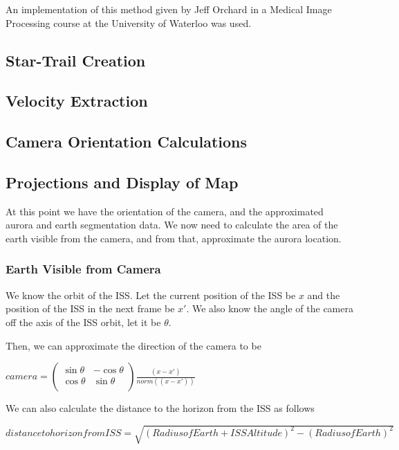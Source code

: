\documentclass[12pt]{article}
\theoremstyle{definition}
\begin{document}
An implementation of this method given by Jeff Orchard in a Medical Image Processing course at the University of Waterloo was used. 

\subsection{ \bf Star-Trail Creation }


\subsection{ \bf Velocity Extraction }


\subsection{ \bf Camera Orientation Calculations }


\subsection{ \bf Projections and Display of Map }

At this point we have the orientation of the camera, and the approximated aurora and earth segmentation data.  We now need to calculate the area of the earth visible from the camera, and from that, approximate the aurora location.

\subsubsection{ \bf Earth Visible from Camera }

We know the orbit of the ISS. Let the current position of the ISS be $x$ and the position of the ISS in the next frame be $x'$. We also know the angle of the camera off the axis of the ISS orbit, let it be $\theta$. 

Then, we can approximate the direction of the camera to be
\begin{center}
$camera = \left(
\begin{array}{cc}
\sin{\theta} & -\cos{\theta} \\
\cos{\theta} & \sin{\theta}\\
\end{array}
\right)
\frac{(x - x')}{norm((x - x'))}$
\end{center}

We can also calculate the distance to the horizon from the ISS as follows
\begin{center}
$distance to horizon from ISS = \sqrt{(Radius of Earth + ISS Altitude)^2 - (Radius of Earth)^2}$
\end{center}
\end{document}

